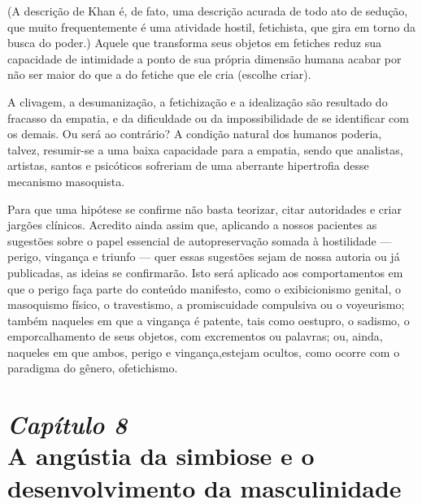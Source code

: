 (A descrição de Khan é, de fato, uma descrição acurada de todo ato de
sedução,\idxseduc{} que muito frequentemente é uma atividade hostil, fetichista,
que gira em torno da busca do poder.) Aquele que transforma seus
objetos em fetiches reduz sua capacidade de intimidade a ponto de sua
própria dimensão humana acabar por não ser maior do que a do fetiche
que ele cria (escolhe criar).

A clivagem, a desumanização, a fetichização e a idealização são
resultado do fracasso da empatia, e da dificuldade ou da
impossibilidade de se identificar com os demais. Ou será ao contrário?
A condição natural dos humanos poderia, talvez, resumir-se a uma baixa
capacidade para a empatia, sendo que analistas, artistas, santos e
psicóticos sofreriam de uma aberrante hipertrofia desse mecanismo\idxmasoq{}
masoquista.

Para que uma hipótese se confirme não basta teorizar, citar
autoridades e criar jargões clínicos. Acredito ainda assim que,
aplicando a nossos pacientes as sugestões sobre o papel essencial de
autopreservação somada à hostilidade\idxhost{} --- perigo, vingança\idxvinga{} e triunfo
--- quer essas sugestões sejam de nossa autoria ou já publicadas, as
ideias se confirmarão. Isto será aplicado aos comportamentos em que o
perigo faça parte do conteúdo manifesto, como o exibicionismo\idxexibi{} genital,
o masoquismo físico, o travestismo, a promiscuidade\idxpromiscomp{} compulsiva ou o
voyeurismo;\idxvoy{} também naqueles em que a vingança é patente, tais como o\idxdesfa[|)]
estupro,\idxestup{} o sadismo,\idxsadi{} o emporcalhamento de seus objetos, com excrementos\idxcopro{}
ou palavras; ou, ainda, naqueles em que ambos, perigo e vingança,\idxdesu[|)]
estejam ocultos, como ocorre com o paradigma do gênero, o\idxfetic[|)] fetichismo.


\chapter[\textbf{8}\quad A angústia da simbiose e o desenvolvimento\\\hspace*{6mm}
da masculinidade]{{\large\textit{Capítulo 8}}\\ A angústia da simbiose e o\\ desenvolvimento da masculinidade}


